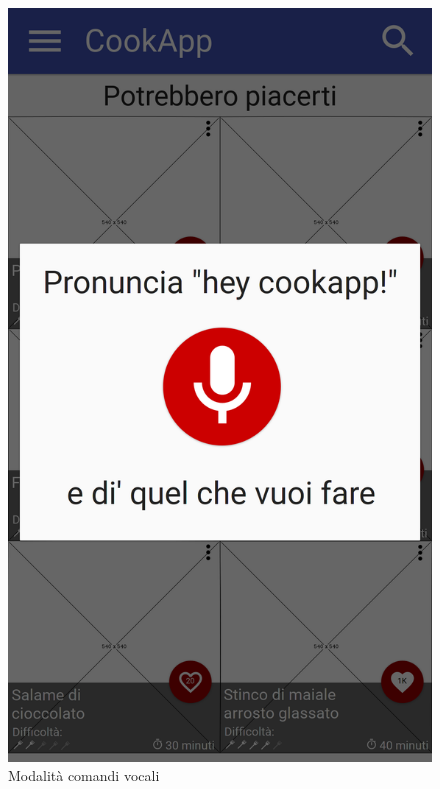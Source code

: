 \begin{figure}[H]
\begin{minipage}{.49\textwidth}
		\includegraphics[width=\textwidth]{img/wireframe/homepage_start_audio.png}
		\caption{Modalità comandi vocali}
		\label{fig:comandi_vocali}
	\end{minipage}
\end{figure}	
